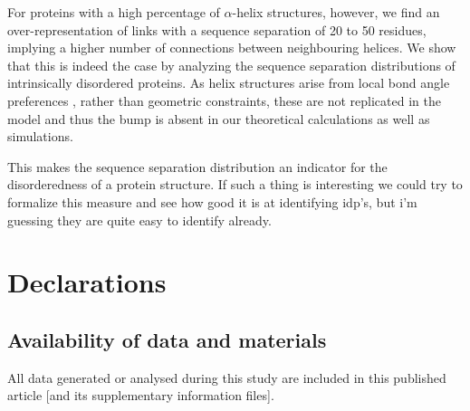 \documentclass[reprint,amsmath,amssymb,rmp,onecolumn,notitlepage,11pt]{revtex4-1}
\newcommand{\red}[1]{\textcolor{red!80!black}{#1}}
\begin{document}
For proteins with a high percentage of $\alpha$-helix structures, however, we find an over-representation of links with a sequence separation of 20 to 50 residues, implying a higher number of connections between neighbouring helices. We show that this is indeed the case by analyzing the sequence separation distributions of intrinsically disordered proteins. As helix structures arise from local bond angle preferences \cite{Danielsson2010}, rather than geometric constraints, these are not replicated in the model and thus the bump is absent in our theoretical calculations as well as simulations.

\red{This makes the sequence separation distribution an indicator for the disorderedness of a protein structure. If such a thing is interesting we could try to formalize this measure and see how good it is at identifying idp's, but i'm guessing they are quite easy to identify already.}

\section*{Declarations}
\subsection{Availability of data and materials}
All data generated or analysed during this study are included in this published article [and its supplementary information files].
\end{document}
